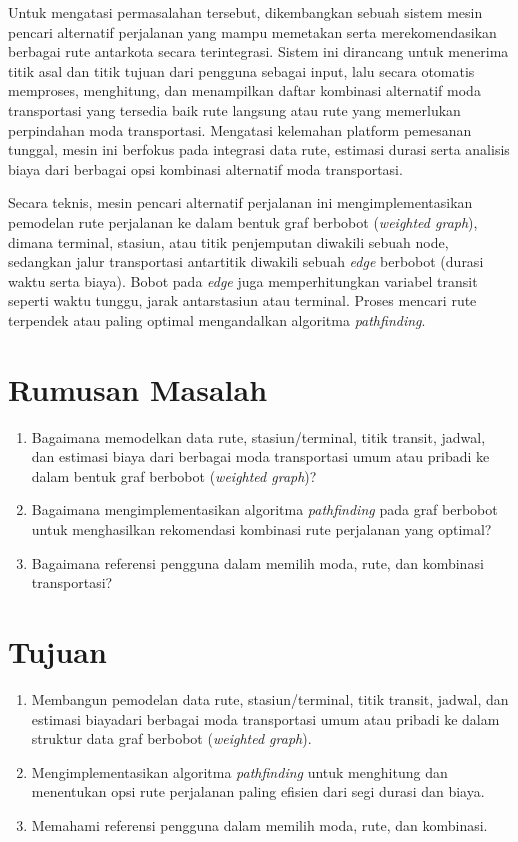 \documentclass[a4paper,twoside]{article}
\begin{document}
	Untuk mengatasi permasalahan tersebut, dikembangkan sebuah sistem mesin pencari alternatif perjalanan yang mampu memetakan serta merekomendasikan berbagai rute antarkota secara terintegrasi. Sistem ini dirancang untuk menerima titik asal dan titik tujuan dari pengguna sebagai input, lalu secara otomatis memproses, menghitung, dan menampilkan daftar kombinasi alternatif moda transportasi yang tersedia baik rute langsung atau rute yang memerlukan perpindahan moda transportasi. Mengatasi kelemahan platform pemesanan tunggal, mesin ini berfokus pada integrasi data rute, estimasi durasi serta analisis biaya dari berbagai opsi kombinasi alternatif moda transportasi.
	
	Secara teknis, mesin pencari alternatif perjalanan ini mengimplementasikan pemodelan rute perjalanan ke dalam bentuk graf berbobot ({\it weighted graph}), dimana terminal, stasiun, atau titik penjemputan diwakili sebuah node, sedangkan jalur transportasi antartitik diwakili sebuah {\it edge} berbobot (durasi waktu serta biaya). Bobot pada \textit{edge} juga memperhitungkan variabel transit seperti waktu tunggu, jarak antarstasiun atau terminal. Proses mencari rute terpendek atau paling optimal mengandalkan algoritma \textit{pathfinding}.
	
	
	\section{Rumusan Masalah}
	\begin{enumerate}
	    \item Bagaimana memodelkan data rute, stasiun/terminal, titik transit, jadwal, dan estimasi biaya dari berbagai moda transportasi umum atau pribadi ke dalam bentuk graf berbobot (\textit{weighted graph})?
        \item Bagaimana mengimplementasikan algoritma \textit{pathfinding} pada graf berbobot untuk menghasilkan rekomendasi kombinasi rute perjalanan yang optimal?
        \item Bagaimana referensi pengguna dalam memilih moda, rute, dan kombinasi transportasi?
	\end{enumerate}
	
	\section{Tujuan}
	\begin{enumerate}
	    \item Membangun pemodelan data rute, stasiun/terminal, titik transit, jadwal, dan estimasi biayadari berbagai moda transportasi umum atau pribadi ke dalam struktur data graf berbobot (\textit{weighted graph}).
        \item Mengimplementasikan algoritma \textit{pathfinding} untuk menghitung dan menentukan opsi rute perjalanan paling efisien dari segi durasi dan biaya.
        \item Memahami referensi pengguna dalam memilih moda, rute, dan kombinasi.
	\end{enumerate}
	
\end{document}
